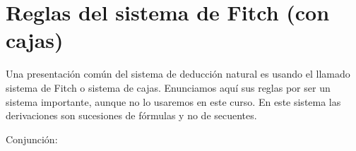 \documentclass[11pt,letterpaper]{article}
\begin{document}





\section{Reglas del sistema de Fitch (con cajas)}

Una presentación común del sistema de deducción natural es usando el llamado 
sistema de Fitch o sistema de cajas. Enunciamos aquí sus reglas por ser un 
sistema importante, aunque no lo usaremos en este curso. En este sistema las 
derivaciones son sucesiones de fórmulas y no de secuentes.
\bi
\item Conjunción:
\begin{mathpar}


\end{mathpar}
\end{document}
